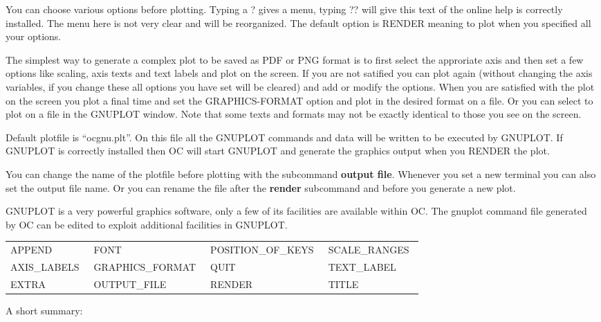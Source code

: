 \documentclass[11pt]{article}
\begin{document}
You can choose various options before plotting. Typing a ? gives a
menu, typing ?? will give this text of the online help is correctly
installed.  The menu here is not very clear and will be reorganized.
The default option is RENDER meaning to plot when you specified all
your options.

The simplest way to generate a complex plot to be saved as PDF or PNG
format is to first select the approriate axis and then set a few
options like scaling, axis texts and text labels and plot on the
screen.  If you are not satified you can plot again (without changing
the axis variables, if you change these all options you have set will
be cleared) and add or modify the options.  When you are satisfied
with the plot on the screen you plot a final time and set the
GRAPHICS-FORMAT option and plot in the desired format on a file.  Or
you can select to plot on a file in the GNUPLOT window.  Note that
some texts and formats may not be exactly identical to those you see
on the screen.

Default plotfile is ``ocgnu.plt''.  On this file all the GNUPLOT
commands and data will be written to be executed by GNUPLOT.  If
GNUPLOT is correctly installed then OC will start GNUPLOT and generate
the graphics output when you RENDER the plot.

You can change the name of the plotfile before plotting with the
subcommand {\bf output file}.  Whenever you set a new terminal you can
also set the output file name.  Or you can rename the file after the
{\bf render} subcommand and before you generate a new plot.

GNUPLOT is a very powerful graphics software, only a few of its
facilities are available within OC.  The gnuplot command file
generated by OC can be edited to exploit additional facilities in
GNUPLOT.

\bigskip

{\small
\begin{tabular}{llll}
 APPEND        & FONT              & POSITION\_OF\_KEYS~ & SCALE\_RANGES~ \\
 AXIS\_LABELS~ & GRAPHICS\_FORMAT~ & QUIT                & TEXT\_LABEL \\
 EXTRA         & OUTPUT\_FILE      & RENDER              & TITLE\\  
\end{tabular}
}

A short summary:
\end{document}
